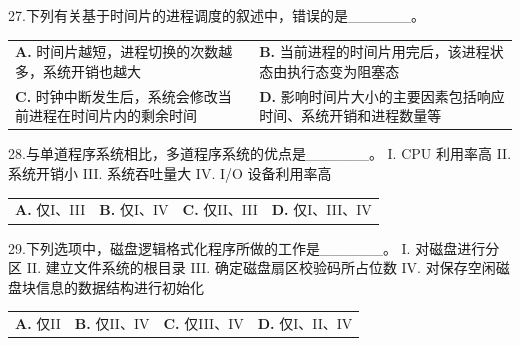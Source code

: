 \documentclass[UTF8,11pt]{ctexart}
\begin{document}
27.下列有关基于时间片的进程调度的叙述中，错误的是\_\_\_\_\_\_。


\begin{center}\begin{tabular}{>{\raggedright\arraybackslash}p{\dimexpr(\linewidth-4\tabcolsep)/2\relax}>{\raggedright\arraybackslash}p{\dimexpr(\linewidth-4\tabcolsep)/2\relax}}
\textbf{A.} 时间片越短，进程切换的次数越多，系统开销也越大 & \textbf{B.} 当前进程的时间片用完后，该进程状态由执行态变为阻塞态\\[.35em]
\textbf{C.} 时钟中断发生后，系统会修改当前进程在时间片内的剩余时间 & \textbf{D.} 影响时间片大小的主要因素包括响应时间、系统开销和进程数量等\\[.35em]\end{tabular}\end{center}

28.与单道程序系统相比，多道程序系统的优点是\_\_\_\_\_\_。 I. CPU 利用率高 II. 系统开销小 III. 系统吞吐量大 IV. I/O 设备利用率高


\begin{center}\begin{tabular}{>{\raggedright\arraybackslash}p{\dimexpr(\linewidth-8\tabcolsep)/4\relax}>{\raggedright\arraybackslash}p{\dimexpr(\linewidth-8\tabcolsep)/4\relax}>{\raggedright\arraybackslash}p{\dimexpr(\linewidth-8\tabcolsep)/4\relax}>{\raggedright\arraybackslash}p{\dimexpr(\linewidth-8\tabcolsep)/4\relax}}
\textbf{A.} 仅I、III & \textbf{B.} 仅I、IV & \textbf{C.} 仅II、III & \textbf{D.} 仅I、III、IV\\[.35em]\end{tabular}\end{center}

29.下列选项中，磁盘逻辑格式化程序所做的工作是\_\_\_\_\_\_。 I. 对磁盘进行分区 II. 建立文件系统的根目录 III. 确定磁盘扇区校验码所占位数 IV. 对保存空闲磁盘块信息的数据结构进行初始化


\begin{center}\begin{tabular}{>{\raggedright\arraybackslash}p{\dimexpr(\linewidth-8\tabcolsep)/4\relax}>{\raggedright\arraybackslash}p{\dimexpr(\linewidth-8\tabcolsep)/4\relax}>{\raggedright\arraybackslash}p{\dimexpr(\linewidth-8\tabcolsep)/4\relax}>{\raggedright\arraybackslash}p{\dimexpr(\linewidth-8\tabcolsep)/4\relax}}
\textbf{A.} 仅II & \textbf{B.} 仅II、IV & \textbf{C.} 仅III、IV & \textbf{D.} 仅I、II、IV\\[.35em]\end{tabular}\end{center}
\end{document}
